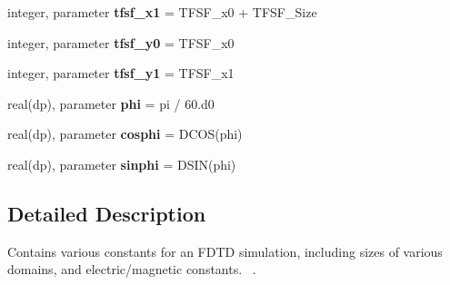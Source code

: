 \begin{DoxyCompactItemize}
\item 
\hypertarget{namespacefdtd__constants_a9bff17498ce852a251e4c2b2d4faf4a4}{}integer, parameter {\bfseries tfsf\+\_\+x1} = T\+F\+S\+F\+\_\+x0 + T\+F\+S\+F\+\_\+\+Size\label{namespacefdtd__constants_a9bff17498ce852a251e4c2b2d4faf4a4}

\item 
\hypertarget{namespacefdtd__constants_aa104fc25c9593c29911cfe82ca7a36f8}{}integer, parameter {\bfseries tfsf\+\_\+y0} = T\+F\+S\+F\+\_\+x0\label{namespacefdtd__constants_aa104fc25c9593c29911cfe82ca7a36f8}

\item 
\hypertarget{namespacefdtd__constants_aa02a6eb2ec76b80ead7e69f264a1b79e}{}integer, parameter {\bfseries tfsf\+\_\+y1} = T\+F\+S\+F\+\_\+x1\label{namespacefdtd__constants_aa02a6eb2ec76b80ead7e69f264a1b79e}

\item 
\hypertarget{namespacefdtd__constants_a29af66cb7d8465a75e35b1e890eaa01d}{}real(dp), parameter {\bfseries phi} = pi / 60.d0\label{namespacefdtd__constants_a29af66cb7d8465a75e35b1e890eaa01d}

\item 
\hypertarget{namespacefdtd__constants_a9abf36b2db0c61092ca81af8939f05fb}{}real(dp), parameter {\bfseries cosphi} = D\+C\+O\+S(phi)\label{namespacefdtd__constants_a9abf36b2db0c61092ca81af8939f05fb}

\item 
\hypertarget{namespacefdtd__constants_a44b6aca1f5c2cf716b3474c29a35b9d9}{}real(dp), parameter {\bfseries sinphi} = D\+S\+I\+N(phi)\label{namespacefdtd__constants_a44b6aca1f5c2cf716b3474c29a35b9d9}

\end{DoxyCompactItemize}


\subsection{Detailed Description}
Contains various constants for an F\+D\+T\+D simulation, including sizes of various domains, and electric/magnetic constants.~\newline
. 

